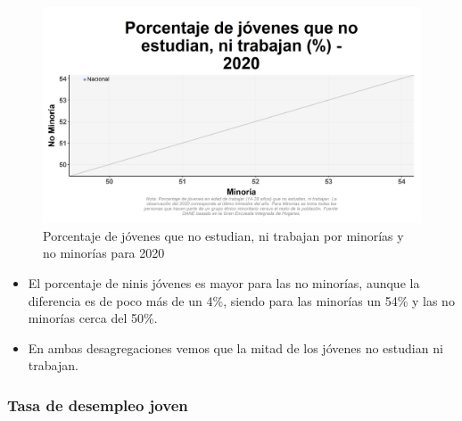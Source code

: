     \begin{figure}[H]
        \caption{Porcentaje de jóvenes que no estudian, ni trabajan por minorías y no minorías para 2020 \label{map_result_2} }
        \begin{center}
        \includegraphics[width=\textwidth,keepaspectratio]{img/var_40_scatter.png}
        \end{center}
    \end{figure}
            \begin{itemize}
                \item El porcentaje de ninis jóvenes es mayor para las no minorías, aunque la diferencia es de poco más de un 4\%, siendo para las minorías un 54\% y las no minorías cerca del 50\%.
                \item En ambas desagregaciones vemos que la mitad de los jóvenes no estudian ni trabajan.
                \end{itemize}

        \subsubsection{Tasa de desempleo joven}


